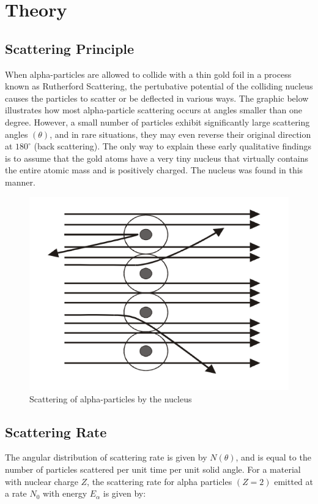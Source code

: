 \section{Theory}
	\subsection{Scattering Principle}
		When alpha-particles are allowed to collide with a thin gold foil in a process known as Rutherford Scattering, the pertubative potential of the colliding nucleus causes the particles to scatter or be deflected in various ways. The graphic below illustrates how most alpha-particle scattering occurs at angles smaller than one degree. However, a small number of particles exhibit significantly large scattering angles $(\theta)$, and in rare situations, they may even reverse their original direction at $180^\circ$ (back scattering). The only way to explain these early qualitative findings is to assume that the gold atoms have a very tiny nucleus that virtually contains the entire atomic mass and is positively charged. The nucleus was found in this manner.

		\begin{figure}[h]
			\centering
			\label{fig:1}
			\includegraphics[width=0.8\columnwidth]{images/theory1.png}
			\caption{Scattering of alpha-particles by the nucleus}
		\end{figure}
	
	\subsection{Scattering Rate}
		The angular distribution of scattering rate is given by $N(\theta)$, and is equal to the number of particles scattered per unit time per unit solid angle. For a material with nuclear charge $Z$, the scattering rate for alpha particles $(Z = 2)$ emitted at a rate $N_0$ with energy $E_\alpha$ is given by:

